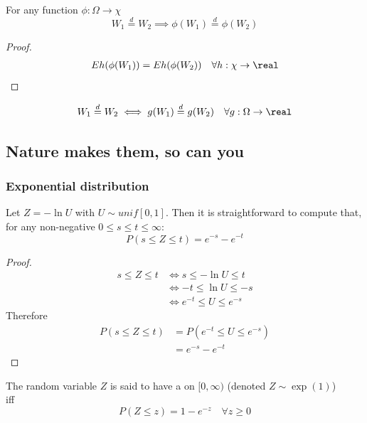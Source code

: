\documentclass[11pt]{article}
\numberwithin{equation}{section}
\begin{document}
\proposition[invariance 1]
For any function $\phi: \Omega \rightarrow \chi$
\begin{equation}
	W_1 \overset{d}{=} W_2 \implies \phi(W_1) \overset{d}{=} \phi(W_2)
\end{equation}
\begin{proof}
\begin{align}
	Eh(\phi(W_1)) = Eh(\phi(W_2)) \quad \forall h: \chi \rightarrow \real
\end{align}
\end{proof}

\proposition[invariance 2]
\begin{equation}
	W_1 \overset{d}{=} W_2 \iff g(W_1) \overset{d}{=}  g(W_2) \quad \forall g: \Omega \rightarrow \real
\end{equation}

\subsection{Nature makes them, so can you}
\subsubsection{Exponential distribution}
Let $Z = -\ln U$ with $U \sim unif[0,1]$. Then it is straightforward to compute that, for any non-negative $0 \leq s \leq t \leq \infty$:
\begin{equation}
	P(s \leq Z \leq t) = e^{-s} - e^{-t}
\end{equation}
\begin{proof}
\begin{align}
	s \leq Z \leq t &\iff s \leq -\ln U \leq t\\
	&\iff -t \leq \ln U \leq -s\\
	&\iff e^{-t} \leq U \leq e^{-s}
\end{align}
Therefore 
\begin{align}
	P(s \leq Z \leq t) &= P(e^{-t} \leq U \leq e^{-s}) \\
	&= e^{-s} - e^{-t}
\end{align}	
\end{proof}
 The random variable $Z$ is said to have a  on $[0, \infty)$ (denoted $Z \sim \exp(1)$)\\
iff \\
\begin{equation}
	P(Z \leq z) = 1 - e^{-z} \quad \forall z \geq 0
\end{equation}
\end{document}

